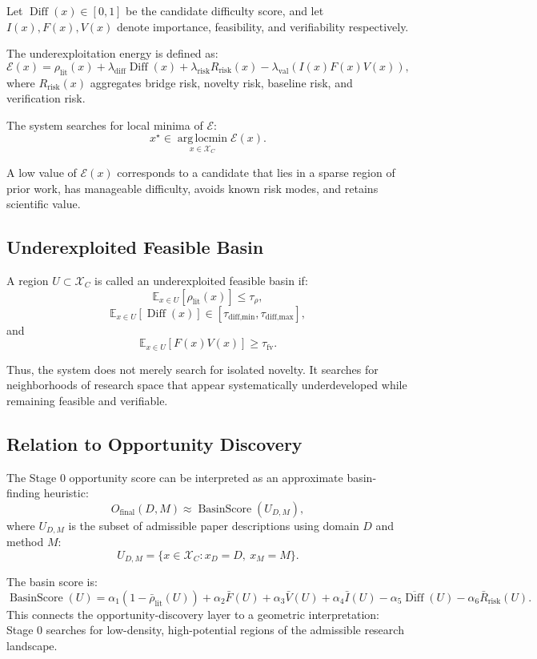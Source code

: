 \documentclass[11pt]{article}
\begin{document}
Let $\operatorname{Diff}(x)\in[0,1]$ be the candidate difficulty score, and let $I(x), F(x), V(x)$ denote importance, feasibility, and verifiability respectively.

The underexploitation energy is defined as:
$$ \mathcal{E}(x) = \rho_{\text{lit}}(x) + \lambda_{\text{diff}}\operatorname{Diff}(x) + \lambda_{\text{risk}}R_{\text{risk}}(x) - \lambda_{\text{val}} \left( I(x)F(x)V(x) \right), $$
where $R_{\text{risk}}(x)$ aggregates bridge risk, novelty risk, baseline risk, and verification risk.

The system searches for local minima of $\mathcal{E}$:
$$ x^\star \in \operatorname*{arg\,locmin}_{x\in\mathcal{X}_C} \mathcal{E}(x). $$

A low value of $\mathcal{E}(x)$ corresponds to a candidate that lies in a sparse region of prior work, has manageable difficulty, avoids known risk modes, and retains scientific value.

\subsection{Underexploited Feasible Basin}
A region $U\subset\mathcal{X}_C$ is called an underexploited feasible basin if:
$$ \mathbb{E}_{x\in U}[\rho_{\text{lit}}(x)]\leq \tau_{\rho}, $$
$$ \mathbb{E}_{x\in U}[\operatorname{Diff}(x)]\in[\tau_{\text{diff,min}},\tau_{\text{diff,max}}], $$
and
$$ \mathbb{E}_{x\in U}[F(x)V(x)]\geq \tau_{\text{fv}}. $$

Thus, the system does not merely search for isolated novelty. It searches for neighborhoods of research space that appear systematically underdeveloped while remaining feasible and verifiable.

\subsection{Relation to Opportunity Discovery}
The Stage 0 opportunity score can be interpreted as an approximate basin-finding heuristic:
$$ O_{\text{final}}(D,M) \approx \operatorname{BasinScore}(U_{D,M}), $$
where $U_{D,M}$ is the subset of admissible paper descriptions using domain $D$ and method $M$:
$$ U_{D,M} = \{x\in\mathcal{X}_C:x_D=D,\ x_M=M\}. $$

The basin score is:
$$ \operatorname{BasinScore}(U) = \alpha_1(1-\bar{\rho}_{\text{lit}}(U)) + \alpha_2\bar{F}(U) + \alpha_3\bar{V}(U) + \alpha_4\bar{I}(U) - \alpha_5\overline{\operatorname{Diff}}(U) - \alpha_6\bar{R}_{\text{risk}}(U). $$
This connects the opportunity-discovery layer to a geometric interpretation: Stage 0 searches for low-density, high-potential regions of the admissible research landscape.
\end{document}
